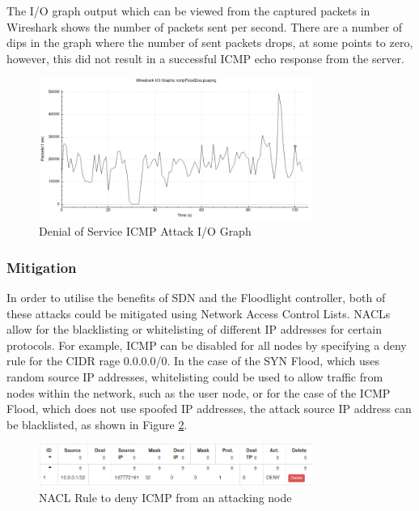 The I/O graph output which can be viewed from the captured packets in Wireshark
shows the number of packets sent per second. There are a number of dips in the
graph where the number of sent packets drops, at some points to zero, however,
this did not result in a successful ICMP echo response from the server.

\begin{figure}[H]
	\centering
	\includegraphics[width=0.8\textwidth]{images/icmpFloodDos}
	\caption{Denial of Service ICMP Attack I/O Graph}
	\label{fig:images-icmpFloodDosIOGraph}
\end{figure}

\subsubsection{Mitigation}

In order to utilise the benefits of SDN and the Floodlight controller, both of
these attacks could be mitigated using Network Access Control Lists. NACLs allow
for the blacklisting or whitelisting of different IP addresses for certain
protocols. For example, ICMP can be disabled for all nodes by specifying a deny
rule for the CIDR rage 0.0.0.0/0. In the case of the SYN Flood, which uses
random source IP addresses, whitelisting could be used to allow traffic from
nodes within the network, such as the user node, or for the case of the ICMP
Flood, which does not use spoofed IP addresses, the attack source IP address can
be blacklisted, as shown in Figure \ref{fig:images-icmpDosAcl}.

\begin{figure}[H]
	\centering
	\includegraphics[width=0.8\textwidth]{images/icmpDosAcl}
	\caption{NACL Rule to deny ICMP from an attacking node}
	\label{fig:images-icmpDosAcl}
\end{figure}

